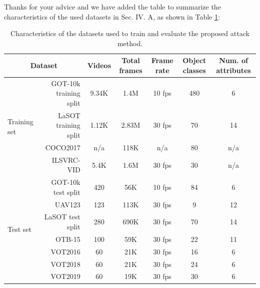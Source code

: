 \documentclass[12pt]{article}
\begin{document}
Thanks for your advice and we have added the table to summarize the characteristics of the used datasets in Sec. IV. A, as shown in Table \ref{tab:dataset}:
\begin{table}[h]
    \caption{Characteristics of the datasets used to train and evaluate the proposed attack method.}
    \begin{tabular}{lrccccc} \toprule
    \multicolumn{2}{c}{Dataset}                            & Videos & Total frames & Frame rate & Object classes & Num. of attributes \\ \midrule
    \multirow{4}{*}{Training set} & GOT-10k training split & 9.34K & 1.4M        & 10 fps     & 480            & 6                  \\
                                  & LaSOT training split   & 1.12K & 2.83M        & 30 fps     & 70             & 14                 \\
                                  & COCO2017               & n/a    & 118K         & n/a        & 80             & n/a                \\
                                  & ILSVRC-VID             & 5.4K  & 1.6M         & 30 fps     & 30             & n/a                \\ \midrule
    \multirow{7}{*}{Test set}     & GOT-10k test split     & 420    & 56K          & 10 fps     & 84             & 6                  \\
                                  & UAV123                 & 123    & 113K         & 30 fps     & 9              & 12                 \\
                                  & LaSOT test split       & 280    & 690K         & 30 fps     & 70             & 14                 \\
                                  & OTB-15                 & 100    & 59K          & 30 fps     & 22             & 11                 \\
                                  & VOT2016                & 60     & 21K          & 30 fps     & 16             & 6                  \\
                                  & VOT2018                & 60     & 21K          & 30 fps     & 24             & 6                  \\ 
                                  & VOT2019                & 60     & 19K          & 30 fps     & 30             & 6                  \\ \bottomrule
    \end{tabular}
    \label{tab:dataset}
\end{table}
\end{document}
